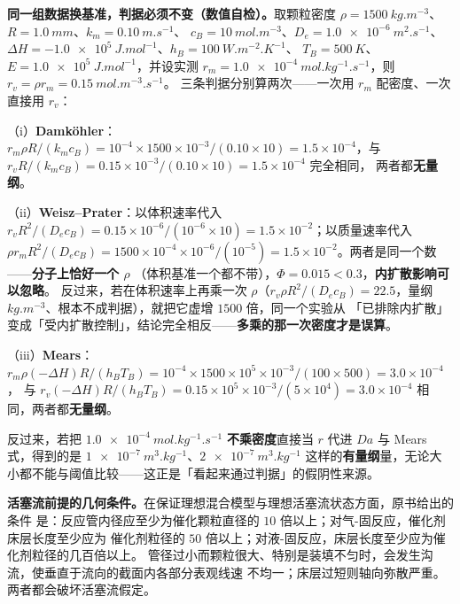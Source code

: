 \textbf{同一组数据换基准，判据必须不变（数值自检）。}取颗粒密度
$\rho=\qty{1500}{kg.m^{-3}}$、$R=\qty{1.0}{mm}$、$k_m=\qty{0.10}{m.s^{-1}}$、
$c_B=\qty{10}{mol.m^{-3}}$、$D_e=\qty{1.0e-6}{m^2.s^{-1}}$、
$\Delta H=\qty{-1.0e5}{J.mol^{-1}}$、$h_B=\qty{100}{W.m^{-2}.K^{-1}}$、
$T_B=\qty{500}{K}$、$E=\qty{1.0e5}{J.mol^{-1}}$，并设实测
$r_m=\qty{1.0e-4}{mol.kg^{-1}.s^{-1}}$，则 $r_v=\rho r_m=\qty{0.15}{mol.m^{-3}.s^{-1}}$。
三条判据分别算两次——一次用 $r_m$ 配密度、一次直接用 $r_v$：

（i）\textbf{Damköhler}：$r_m\rho R/(k_mc_B)
=10^{-4}\times1500\times10^{-3}/(0.10\times10)=1.5\times10^{-4}$，与
$r_vR/(k_mc_B)=0.15\times10^{-3}/(0.10\times10)=1.5\times10^{-4}$ 完全相同，
两者都\textbf{无量纲}。

（ii）\textbf{Weisz--Prater}：以体积速率代入
$r_vR^{2}/(D_ec_B)=0.15\times10^{-6}/(10^{-6}\times10)
=1.5\times10^{-2}$；以质量速率代入
$\rho r_mR^{2}/(D_ec_B)=1500\times10^{-4}\times10^{-6}/(10^{-5})
=1.5\times10^{-2}$。两者是同一个数——\textbf{分子上恰好一个 $\rho$}
（体积基准一个都不带），$\Phi=0.015<0.3$，\textbf{内扩散影响可以忽略}。
反过来，若在体积速率上再乘一次 $\rho$（$r_v\rho R^{2}/(D_ec_B)=22.5$，量纲
$\unit{kg.m^{-3}}$、根本不成判据），就把它虚增 $1500$ 倍，同一个实验从
「已排除内扩散」变成「受内扩散控制」，结论完全相反——\textbf{多乘的那一次密度才是误算}。

（iii）\textbf{Mears}：$r_m\rho(-\Delta H)R/(h_BT_B)
=10^{-4}\times1500\times10^{5}\times10^{-3}/(100\times500)=3.0\times10^{-4}$，
与 $r_v(-\Delta H)R/(h_BT_B)=0.15\times10^{5}\times10^{-3}/(5\times10^{4})
=3.0\times10^{-4}$ 相同，两者都\textbf{无量纲}。

反过来，若把 $\qty{1.0e-4}{mol.kg^{-1}.s^{-1}}$ \textbf{不乘密度}直接当 $r$ 代进
$Da$ 与 Mears 式，得到的是 $\qty{1e-7}{m^3.kg^{-1}}$、$\qty{2e-7}{m^3.kg^{-1}}$
这样的\textbf{有量纲}量，无论大小都不能与阈值比较——这正是「看起来通过判据」的假阴性来源。

\textbf{活塞流前提的几何条件。}在保证理想混合模型与理想活塞流状态方面，原书给出的条件
是：反应管内径应至少为催化颗粒直径的 $10$ 倍以上；对气-固反应，催化剂床层长度至少应为
催化剂粒径的 $50$ 倍以上；对液-固反应，床层长度至少应为催化剂粒径的几百倍以上。
管径过小而颗粒很大、特别是装填不匀时，会发生沟流，使垂直于流向的截面内各部分表观线速
不均一；床层过短则轴向弥散严重。两者都会破坏活塞流假定。

